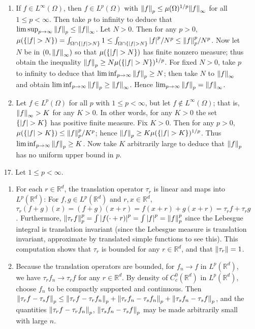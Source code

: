 \documentclass[11pt,leqno]{article}
\theoremstyle{plain}
\theoremstyle{definition}
\numberwithin{equation}{section}
\numberwithin{lem}{section}
\newcommand{\cbr}[1]{\left\{#1\right\}}
\begin{document}
\begin{enumerate}
\begin{enumerate}
    \item If $f\in L^\infty(\Omega)$, then $f\in L^p(\Omega)$ with $\norm{f}_p\leq \mu(\Omega)^{1/p}\norm{f}_\infty$ for all $1\leq p< \infty$. Then take $p$ to infinity to deduce that $\limsup_{p\to\infty}\norm{f}_p\leq \norm{f}_\infty$. Let $N>0$. Then for any $p>0$, $\mu(\cbr{\abs{f}>N}) = \int_{\Omega\cap\cbr{\abs{f}>N}} 1\leq \int_{\Omega\cap\cbr{\abs{f}>N}} \abs{f}^p/N^p \leq \norm{f}_p^p/N^p$. Now let $N$ be in $(0,\norm{f}_\infty)$ so that $\mu(\cbr{\abs{f}>N})$ has finite nonzero measure; thus obtain the inequality $\norm{f}_p\geq N\mu(\cbr{\abs{f}>N})^{1/p}$. For fixed $N>0$, take $p$ to infinity to deduce that $\liminf_{p\to\infty} \norm{f}_p\geq N$; then take $N$ to $\norm{f}_\infty$ and obtain $\liminf_{p\to\infty} \norm{f}_p\geq \norm{f}_\infty$. Hence $\lim_{p\to\infty} \norm{f}_p = \norm{f}_\infty$.
    
    \item Let $f\in L^p(\Omega)$ for all $p$ with $1\leq p <\infty$, but let $f\not\in L^\infty(\Omega)$; that is, $\norm{f}_\infty >K$ for any $K>0$. In other words, for any $K>0$ the set $\cbr{\abs{f}>K}$ has positive finite measure. Fix $K>0$. Then for any $p>0$, $\mu(\cbr{\abs{f}>K})\leq \norm{f}_p^p/K^p$; hence $\norm{f}_p\geq K\mu(\cbr{\abs{f}>K})^{1/p}$. Thus $\liminf_{p\to\infty}\norm{f}_p \geq K$. Now take $K$ arbitrarily large to deduce that $\norm{f}_p$ has no uniform upper bound in $p$.
  \end{enumerate}
  
  \item[17.] Let $1\leq p<\infty$.
  \begin{enumerate}
    \item For each $r\in \mathbb R^d$, the translation operator $\tau_r$ is linear and maps into $L^p(\mathbb R^d)$: For $f,g\in L^p(\mathbb R^d)$ and $r,x\in \mathbb R^d$, $\tau_r(f+g)(x) = (f+g)(x+r) = f(x+r)+ g(x+r) = \tau_rf + \tau_rg$. Furthermore, $\norm{\tau_r f}_p^p = \int \abs{f(\cdot+r)}^p = \int \abs{f}^p = \norm{f}_p^p$ since the Lebesgue integral is translation invariant (since the Lebesgue measure is translation invariant, approximate by translated simple functions to see this). This computation shows that $\tau_r$ is bounded for any $r\in\mathbb R^d$, and that $\norm{\tau_r} = 1$. 
    
    \item Because the translation operators are bounded, for $f_n\to f$ in $L^p(\mathbb R^d)$, we have $\tau_rf_n\to \tau_rf$ for any $r\in \mathbb R^d$. By density of $C_c^0(\mathbb R^d)$ in $L^p(\mathbb R^d)$, choose $f_n$ to be compactly supported and continuous. Then $\norm{\tau_rf - \tau_s f}_p\leq \norm{\tau_rf - \tau_rf_n}_p + \norm{\tau_rf_n - \tau_sf_n}_p + \norm{\tau_sf_n - \tau_s f}_p$, and the quantities $\norm{\tau_rf - \tau_rf_n}_p$, $\norm{\tau_sf_n - \tau_s f}_p$ may be made arbitrarily small with large $n$.
    

\end{enumerate}
\end{enumerate}
\end{document}
